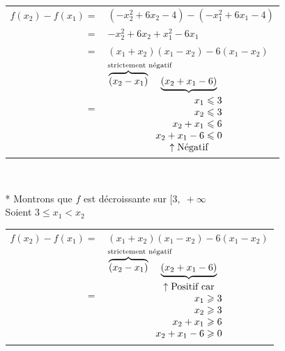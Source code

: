 \begin{enumerate}
\begin{itemize}
\begin{tabular}{r@{$\;$}l}
$f(x_2) -f(x_1) =$      &  $ (-x_{2}^{2} +6x_2 -4 ) - (-x_{1}^{2} +6x_1 -4 ) $\\
         $=$ & $  -x_{2}^{2} +6x_2 +x_{1}^{2} -6x_1 $\\
         $=$ & $(x_1 + x_2) (x_1 - x_2) -6 (x_1 -x_2) $ \\        
         $=$ & $\overbrace{(x_2 - x_1)}^\text{\makebox[1.5cm][l]{strictement négatif}}
    \underbrace{(x_2 + x_1 -6 )}_{\begin{array}{r@{\;\leqslant\;}l}
                                       x_1 & 3 \\
                                       x_2 & 3 \\
                                  x_2 + x_1 & 6 \\
                                x_2 +x_1 -6 & 0 \\
                       \multicolumn{2}{c}{\uparrow\text{Négatif}}\\
                                    \end{array}
                                  }
    $
\end{tabular}\\

\item [*] Montrons que $f$ est décroissante sur $[3,\; +\infty$ \\

Soient $3 \leqslant x_1 < x_2$  \\

\begin{tabular}{r@{$\;$}l}
$f(x_2) -f(x_1) =$      & $(x_1 + x_2) (x_1 - x_2) -6 (x_1 -x_2) $ \\        
         $=$ & $\overbrace{(x_2 - x_1)}^\text{\makebox[1.5cm][l]{strictement négatif}}
    \underbrace{(x_2 + x_1 -6 )}_{\begin{array}{r@{\;\geqslant\;}l}
                           \multicolumn{2}{c}{\uparrow\text{Positif car}}\\
                                       x_1 & 3 \\
                                       x_2 & 3 \\
                                  x_2 + x_1 & 6 \\
                                x_2 +x_1 -6 & 0 \\
                                    \end{array}
                                  }
    $
\end{tabular}\\ 


\end{itemize}
\end{enumerate}
